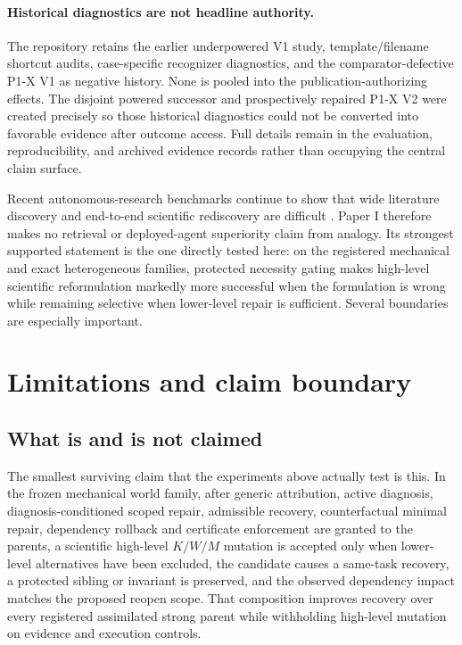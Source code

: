 \paragraph{Historical diagnostics are not headline authority.}
The repository retains the earlier underpowered V1 study, template/filename shortcut audits, case-specific recognizer diagnostics, and the comparator-defective P1-X V1 as negative history. None is pooled into the publication-authorizing effects. The disjoint powered successor and prospectively repaired P1-X V2 were created precisely so those historical diagnostics could not be converted into favorable evidence after outcome access. Full details remain in the evaluation, reproducibility, and archived evidence records rather than occupying the central claim surface.

Recent autonomous-research benchmarks continue to show that wide literature discovery and end-to-end scientific rediscovery are difficult \cite{autoresearchbench2026,researchclawbench2026}. Paper I therefore makes no retrieval or deployed-agent superiority claim from analogy. Its strongest supported statement is the one directly tested here: on the registered mechanical and exact heterogeneous families, protected necessity gating makes high-level scientific reformulation markedly more successful when the formulation is wrong while remaining selective when lower-level repair is sufficient.
Several boundaries are especially important.
\section{Limitations and claim boundary}
\label{sec:limitations}

\subsection{What is and is not claimed}

The smallest surviving claim that the experiments above actually test is this.
In the frozen mechanical world family, after generic attribution, active
diagnosis, diagnosis-conditioned scoped repair, admissible recovery,
counterfactual minimal repair, dependency rollback and certificate enforcement
are granted to the parents, a scientific high-level $K/W/M$ mutation is accepted
only when lower-level alternatives have been excluded, the candidate causes a
same-task recovery, a protected sibling or invariant is preserved, and the
observed dependency impact matches the proposed reopen scope. That composition
improves recovery over every registered assimilated strong parent while
withholding high-level mutation on evidence and execution controls.

